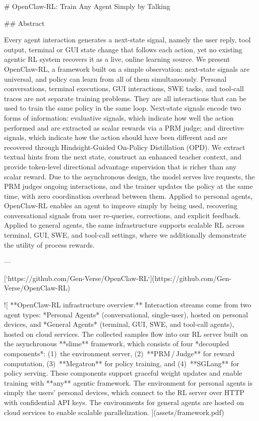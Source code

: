 # OpenClaw-RL: Train Any Agent Simply by Talking

## Abstract

Every agent interaction generates a next-state signal, namely the user reply, tool output, terminal or GUI state change that follows each action, yet no existing agentic RL system recovers it as a live, online learning source. We present OpenClaw-RL, a framework built on a simple observation: next-state signals are universal, and policy can learn from all of them simultaneously. Personal conversations, terminal executions, GUI interactions, SWE tasks, and tool-call traces are not separate training problems. They are all interactions that can be used to train the same policy in the same loop. Next-state signals encode two forms of information: evaluative signals, which indicate how well the action performed and are extracted as scalar rewards via a PRM judge; and directive signals, which indicate how the action should have been different and are recovered through Hindsight-Guided On-Policy Distillation (OPD). We extract textual hints from the next state, construct an enhanced teacher context, and provide token-level directional advantage supervision that is richer than any scalar reward. Due to the asynchronous design, the model serves live requests, the PRM judges ongoing interactions, and the trainer updates the policy at the same time, with zero coordination overhead between them. Applied to personal agents, OpenClaw-RL enables an agent to improve simply by being used, recovering conversational signals from user re-queries, corrections, and explicit feedback. Applied to general agents, the same infrastructure supports scalable RL across terminal, GUI, SWE, and tool-call settings, where we additionally demonstrate the utility of process rewards.

---

[`https://github.com/Gen-Verse/OpenClaw-RL`](https://github.com/Gen-Verse/OpenClaw-RL)

![ **OpenClaw-RL infrastructure overview.** Interaction streams come from two agent types: *Personal Agents* (conversational, single-user), hosted on personal devices, and *General Agents* (terminal, GUI, SWE, and tool-call agents), hosted on cloud services. The collected samples flow into our RL server built on the asynchronous **slime** framework, which consists of four *decoupled components*: (1) the environment server, (2) **PRM / Judge** for reward computation, (3) **Megatron** for policy training, and (4) **SGLang** for policy serving. These components support graceful weight updates and enable training with **any** agentic framework. The environment for personal agents is simply the users' personal devices, which connect to the RL server over HTTP with confidential API keys. The environments for general agents are hosted on cloud services to enable scalable parallelization. ](assets/framework.pdf)

